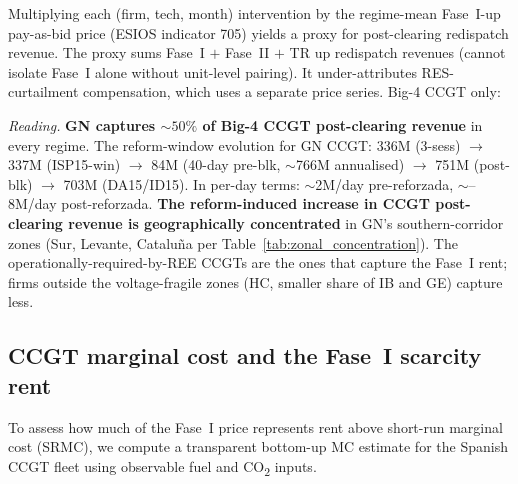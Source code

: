 \documentclass[11pt,a4paper]{article}
\begin{document}
Multiplying each (firm, tech, month) intervention by the regime-mean Fase~I-up pay-as-bid price (ESIOS indicator 705) yields a proxy for post-clearing redispatch revenue. The proxy sums Fase~I $+$ Fase~II $+$ TR up redispatch revenues (cannot isolate Fase~I alone without unit-level pairing). It under-attributes RES-curtailment compensation, which uses a separate price series. Big-4 CCGT only:

\begin{table}[H]
\centering\scriptsize
\caption{\textbf{Per-firm CCGT up-redispatch revenue (proxy), EUR million per regime window.} Computed as $\sum_{m \in \text{regime}}$ (intervention MWh)$_m$ $\times$ regime-mean Fase~I-up pay-as-bid price (ESIOS indicator 705). The Big-4 sum in DA15/ID15 ($\sim\texteuro 1{,}390$M) sits close to the REE-published Fase~I-up cost ($\texteuro 1{,}200$M in Table~\ref{tab:cascade_costs_official}); the $\sim 15\%$ overshoot reflects the inclusion of TR-up and Fase~II-up volumes that our PHF~$-$~PDBF gap aggregates into the same Fase~I-up multiplier.}
\label{tab:ccgt_post_clearing_rev}
\setlength{\tabcolsep}{4pt}

\end{table}

\textit{Reading.} \textbf{GN captures $\sim 50\%$ of Big-4 CCGT post-clearing revenue} in every regime. The reform-window evolution for GN CCGT: \texteuro 336M (3-sess) $\to$ \texteuro 337M (ISP15-win) $\to$ \texteuro 84M (40-day pre-blk, $\sim$\texteuro 766M annualised) $\to$ \texteuro 751M (post-blk) $\to$ \texteuro 703M (DA15/ID15). In per-day terms: $\sim$\texteuro 2M/day pre-reforzada, $\sim$--8M/day post-reforzada. \textbf{The reform-induced increase in CCGT post-clearing revenue is geographically concentrated} in GN's southern-corridor zones (Sur, Levante, Cataluña per Table~\ref{tab:zonal_concentration}). The operationally-required-by-REE CCGTs are the ones that capture the Fase~I rent; firms outside the voltage-fragile zones (HC, smaller share of IB and GE) capture less.

\subsection{CCGT marginal cost and the Fase~I scarcity rent}\label{sec:prov:phf_minus_pdbf:mc}

To assess how much of the Fase~I price represents rent above short-run marginal cost (SRMC), we compute a transparent bottom-up MC estimate for the Spanish CCGT fleet using observable fuel and CO\textsubscript{2} inputs.
\end{document}
